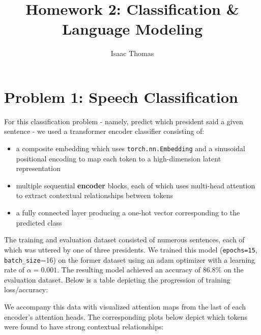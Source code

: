 \documentclass[10pt]{article}
\title{Homework 2: Classification \& Language Modeling}
\author{Isaac Thomas}
\newcommand{\code}[1]{\texttt{#1}}
\theoremstyle{definition}
\begin{document}
\maketitle

\section{Problem 1: Speech Classification}
\noindent For this classification problem - namely, predict which president said a given sentence - we used a transformer encoder classifier consisting of:
\begin{itemize}
    \item a composite embedding which uses \code{torch.nn.Embedding} and a sinusoidal positional encoding to map each token to a high-dimension latent representation
    \item multiple sequential \textbf{encoder} blocks, each of which uses multi-head attention to extract contextual relationships between tokens
    \item a fully connected layer producing a one-hot vector corresponding to the predicted class
\end{itemize}

\noindent The training and evaluation dataset consisted of numerous sentences, each of which was uttered by one of three presidents. We trained this model (\code{epochs=15}, \code{batch\_size}=16) on the former dataset using an adam optimizer with a learning rate of $\alpha = 0.001$. The resulting model achieved an accuracy of $86.8\%$ on the evaluation dataset. Below is a table depicting the progression of training loss/accuracy:\\
\begin{center}
\end{center}

\noindent We accompany this data with visualized attention maps from the last of each encoder's attention heads. The corresponding plots below depict which tokens were found to have strong contextual relationships:
\end{document}
